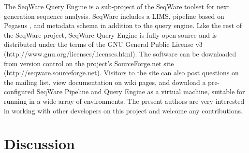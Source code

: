 \documentclass[10pt]{bmc_article}
\newenvironment{bmcformat}{\begin{raggedright}\baselineskip20pt\sloppy\setboolean{publ}{false}}{\end{raggedright}\baselineskip20pt\sloppy}
\begin{document}
\begin{bmcformat}
The SeqWare Query Engine is a sub-project of the SeqWare toolset for next generation sequence analysis. SeqWare includes a LIMS, pipeline based on Pegasus \cite{deelman2005pegasus}, and metadata schema in addition to the query engine. Like the rest of the SeqWare project, SeqWare Query Engine is fully open source and is distributed under the terms of the GNU General Public License v3 (http://www.gnu.org/licenses/licenses.html). The software can be downloaded from version control on the project’s SourceForge.net site (http://seqware.sourceforge.net). Visitors to the site can also post questions on the mailing list, view documentation on wiki pages, and download a pre-configured SeqWare Pipeline and Query Engine as a virtual machine, suitable for running in a wide array of environments. The present authors are very interested in working with other developers on this project and welcome any contributions.


\section*{Discussion}


\end{bmcformat}
\end{document}
